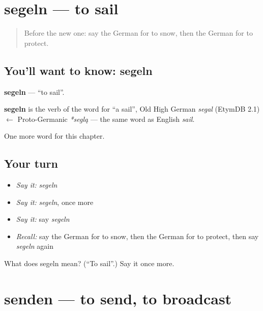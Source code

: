 \section[segeln]{segeln — to sail}

\label{lesson:GE-C186-segeln}



\begin{quote}
Before the new one: say the German for to snow, then the German for to protect.
\end{quote}

\subsection*{You'll want to know: segeln}
\textbf{segeln} — \textquotedblleft{}to sail\textquotedblright{}.

\begin{cousinweb}
\textbf{segeln} is the verb of the word for \textquotedblleft{}a sail\textquotedblright{}, Old High German \emph{segal} (EtymDB 2.1) $\leftarrow$ Proto-Germanic \emph{*seglą} — the same word as English \emph{sail}.
\end{cousinweb}

\begin{grammarlens}[title={What you've built}]
One more word for this chapter.
\end{grammarlens}

\subsection*{Your turn}
\begin{itemize}
\raggedright
  \item \emph{Say it:} \emph{segeln}
  \item \emph{Say it:} \emph{segeln}, once more
  \item \emph{Say it:} say \emph{segeln}
  \item \emph{Recall:} say the German for to snow, then the German for to protect, then say \emph{segeln} again
\end{itemize}

\begin{tcolorbox}[breakable,colback=teal!4,colframe=teal!35!black,title={Before you move on}]
What does segeln mean? (\textquotedblleft{}To sail\textquotedblright{}.) Say it once more.
\end{tcolorbox}
\section[senden]{senden — to send, to broadcast}

